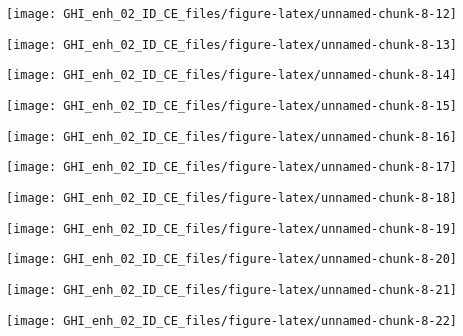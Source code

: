 \documentclass[
  10pt,
  a4paper,oneside]{article}
\begin{document}
\begin{center}\texttt{[image: GHI\_enh\_02\_ID\_CE\_files/figure-latex/unnamed-chunk-8-12]} \end{center}

\begin{center}\texttt{[image: GHI\_enh\_02\_ID\_CE\_files/figure-latex/unnamed-chunk-8-13]} \end{center}

\begin{center}\texttt{[image: GHI\_enh\_02\_ID\_CE\_files/figure-latex/unnamed-chunk-8-14]} \end{center}

\begin{center}\texttt{[image: GHI\_enh\_02\_ID\_CE\_files/figure-latex/unnamed-chunk-8-15]} \end{center}

\begin{center}\texttt{[image: GHI\_enh\_02\_ID\_CE\_files/figure-latex/unnamed-chunk-8-16]} \end{center}

\begin{center}\texttt{[image: GHI\_enh\_02\_ID\_CE\_files/figure-latex/unnamed-chunk-8-17]} \end{center}

\begin{center}\texttt{[image: GHI\_enh\_02\_ID\_CE\_files/figure-latex/unnamed-chunk-8-18]} \end{center}

\begin{center}\texttt{[image: GHI\_enh\_02\_ID\_CE\_files/figure-latex/unnamed-chunk-8-19]} \end{center}

\begin{center}\texttt{[image: GHI\_enh\_02\_ID\_CE\_files/figure-latex/unnamed-chunk-8-20]} \end{center}

\begin{center}\texttt{[image: GHI\_enh\_02\_ID\_CE\_files/figure-latex/unnamed-chunk-8-21]} \end{center}

\begin{center}\texttt{[image: GHI\_enh\_02\_ID\_CE\_files/figure-latex/unnamed-chunk-8-22]} \end{center}
\end{document}
